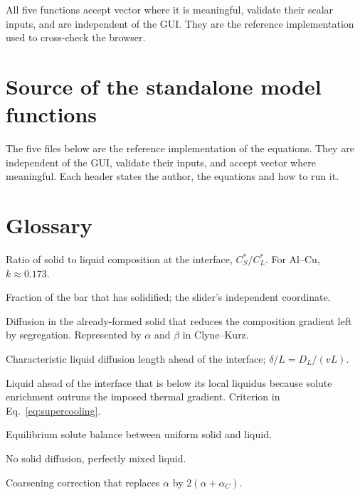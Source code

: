 \documentclass[11pt,a4paper]{article}
\newcommand{\code}[1]{\texttt{\detokenize{#1}}}
\begin{document}
All five functions accept vector \code{fs} where it is meaningful, validate
their scalar inputs, and are independent of the GUI. They are the reference
implementation used to cross-check the browser.

\section{Source of the standalone model functions}

The five files below are the reference implementation of the equations. They
are independent of the GUI, validate their inputs, and accept vector
\code{fs} where meaningful. Each header states the author, the equations and
how to run it.











\section{Glossary}

\begin{description}[leftmargin=0em,itemsep=0.25em]
  \item[Partition coefficient $k$] Ratio of solid to liquid composition at the
        interface, $C_S^*/C_L^*$. For Al--Cu, $k\approx0.173$.
  \item[Solid fraction $f_s$] Fraction of the bar that has solidified; the
        slider's independent coordinate.
  \item[Back diffusion] Diffusion in the already-formed solid that reduces the
        composition gradient left by segregation. Represented by $\alpha$ and
        $\beta$ in Clyne--Kurz.
  \item[Boundary layer $\delta$] Characteristic liquid diffusion length ahead
        of the interface; $\delta/L=D_L/(vL)$.
  \item[Constitutional supercooling] Liquid ahead of the interface that is
        below its local liquidus because solute enrichment outruns the imposed
        thermal gradient. Criterion in Eq.~\eqref{eq:supercooling}.
  \item[Lever rule] Equilibrium solute balance between uniform solid and liquid.
  \item[Scheil--Gulliver] No solid diffusion, perfectly mixed liquid.
  \item[Won--Thomas] Coarsening correction that replaces $\alpha$ by
        $2(\alpha+\alpha_C)$.
\end{description}
\end{document}
